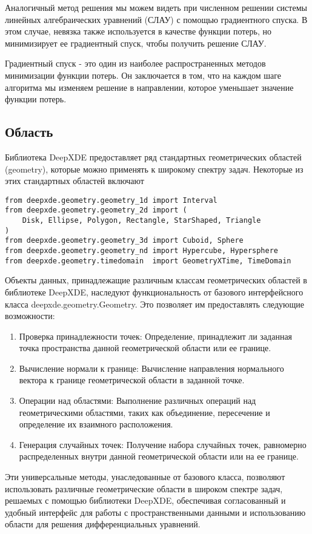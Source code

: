 Аналогичный метод решения мы можем видеть при численном решении системы линейных алгебраических уравнений (СЛАУ)
с помощью градиентного спуска. В этом случае, невязка также используется в качестве функции потерь, но минимизирует
ее градиентный спуск, чтобы получить решение СЛАУ.

Градиентный спуск - это один из наиболее распространенных методов минимизации функции потерь. Он заключается в том,
что на каждом шаге алгоритма мы изменяем решение в направлении, которое уменьшает значение функции потерь.

\subsection{Область}
Библиотека DeepXDE предоставляет ряд стандартных геометрических областей (geometry), которые можно применять к широкому
спектру задач. Некоторые из этих стандартных областей включают
\begin{verbatim}
from deepxde.geometry.geometry_1d import Interval
from deepxde.geometry.geometry_2d import (
    Disk, Ellipse, Polygon, Rectangle, StarShaped, Triangle
)
from deepxde.geometry.geometry_3d import Cuboid, Sphere
from deepxde.geometry.geometry_nd import Hypercube, Hypersphere
from deepxde.geometry.timedomain  import GeometryXTime, TimeDomain
\end{verbatim}
Объекты данных, принадлежащие различным классам геометрических областей в библиотеке DeepXDE, наследуют функциональность
от базового интерфейсного класса deepxde.geometry.Geometry. Это позволяет им предоставлять следующие возможности:
\begin{enumerate}
    \item Проверка принадлежности точек: Определение, принадлежит ли заданная точка пространства данной геометрической
    области или ее границе.
    \item Вычисление нормали к границе: Вычисление направления нормального вектора к границе геометрической области в
    заданной точке.
    \item Операции над областями: Выполнение различных операций над геометрическими областями, таких как объединение,
    пересечение и определение их взаимного расположения.
    \item Генерация случайных точек: Получение набора случайных точек, равномерно распределенных внутри данной
    геометрической области или на ее границе.
\end{enumerate}
Эти универсальные методы, унаследованные от базового класса, позволяют использовать различные геометрические
области в широком спектре задач, решаемых с помощью библиотеки DeepXDE, обеспечивая согласованный и удобный
интерфейс для работы с пространственными данными и использованию области для решения дифференциальных уравнений.

